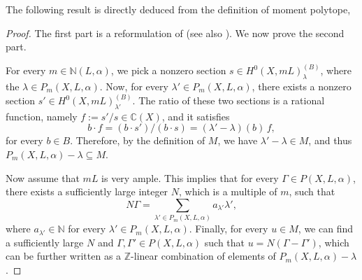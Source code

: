 The following result is directly deduced from the definition of moment polytope, 

\begin{proof}
	The first part is a reformulation of \cite[\S1.2, Proposition 3]{Brion_var_sph} (see also \cite[Lemma 2.21 (ii)]{Brion_intro_act_alg_grp}). We now prove the second part.

	For every $m \in \mathbb{N}(L, \alpha)$, we pick a nonzero section
	$s \in H^0(X, mL)^{(B)}_\lambda$, where the $\lambda \in P_m(X, L, \alpha)$. Now, for every
	$\lambda' \in P_m(X, L, \alpha)$, there exists a nonzero section
	$s' \in H^0(X, mL)^{(B)}_{\lambda'}$.
	The ratio of these two sections is a rational function, namely
	$f := s' / s \in \mathbb{C}(X)$, and it satisfies
	\begin{equation*}
		b \cdot f = (b \cdot s') / (b \cdot s)
		= (\lambda' - \lambda)(b)\, f,
	\end{equation*}
	for every $b \in B$. Therefore, by the definition of $M$, we have
	$\lambda' - \lambda \in M$, and thus
	$P_m(X, L, \alpha) - \lambda \subseteq M$.

	Now assume that $mL$ is very ample. This implies that for every
	$\Gamma \in P(X, L, \alpha)$, there exists a sufficiently large integer
	$N$, which is a multiple of $m$, such that
	\begin{equation*}
		N \Gamma = \sum_{{\lambda'} \in P_m(X, L, \alpha)} a_{\lambda'} {\lambda'},
	\end{equation*}
	where $a_{\lambda'} \in \mathbb{N}$ for every
	${\lambda'} \in P_m(X, L, \alpha)$.
	Finally, for every $u \in M$, we can find a sufficiently large $N$
	and $\Gamma, \Gamma' \in P(X, L, \alpha)$ such that
	$u = N(\Gamma - \Gamma')$, which can be further written as a
	$\mathbb{Z}$-linear combination of elements of
	$P_m(X, L, \alpha) - \lambda$.
\end{proof}